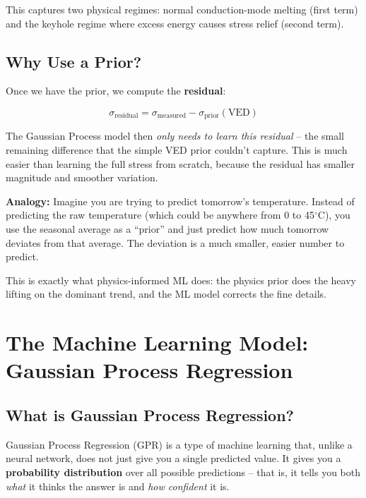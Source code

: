 \documentclass[12pt,a4paper]{report}
\begin{document}
This captures two physical regimes: normal conduction-mode melting (first term) and the keyhole regime where excess energy causes stress relief (second term).

\section{Why Use a Prior?}

Once we have the prior, we compute the \textbf{residual}:

\begin{equation}
\sigma_{\text{residual}} = \sigma_{\text{measured}} - \sigma_{\text{prior}}(\text{VED})
\label{eq:residual}
\end{equation}

The Gaussian Process model then \textit{only needs to learn this residual} -- the small remaining difference that the simple VED prior couldn't capture. This is much easier than learning the full stress from scratch, because the residual has smaller magnitude and smoother variation.

\begin{keybox}
\textbf{Analogy:} Imagine you are trying to predict tomorrow's temperature. Instead of predicting the raw temperature (which could be anywhere from 0 to 45$^\circ$C), you use the seasonal average as a ``prior'' and just predict how much tomorrow deviates from that average. The deviation is a much smaller, easier number to predict.

This is exactly what physics-informed ML does: the physics prior does the heavy lifting on the dominant trend, and the ML model corrects the fine details.
\end{keybox}

\chapter{The Machine Learning Model: Gaussian Process Regression}

\section{What is Gaussian Process Regression?}

Gaussian Process Regression (GPR) is a type of machine learning that, unlike a neural network, does not just give you a single predicted value. It gives you a \textbf{probability distribution} over all possible predictions -- that is, it tells you both \textit{what} it thinks the answer is and \textit{how confident} it is.
\end{document}

